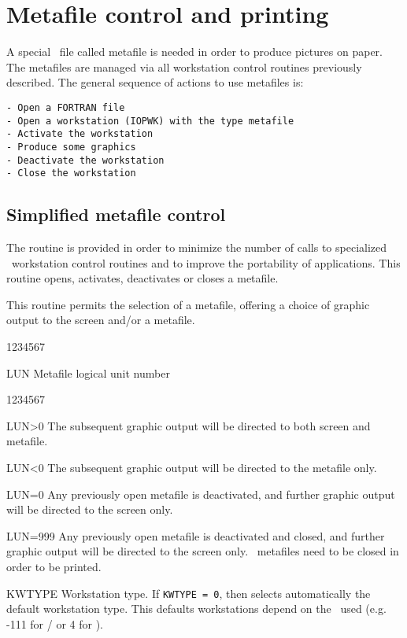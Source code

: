 %
%
\section{Metafile control and printing}
A special \ASCII~file called metafile is needed in order to produce pictures
on paper. The metafiles are managed via all workstation control routines
previously described. The general sequence of actions to use metafiles is:
\begin{verbatim}
- Open a FORTRAN file
- Open a workstation (IOPWK) with the type metafile
- Activate the workstation
- Produce some graphics
- Deactivate the workstation
- Close the workstation
\end{verbatim}
%
\subsection{Simplified metafile control}
The routine  is provided in order to minimize the number of
calls to specialized \HIGZ~workstation control routines and to improve
the portability of applications. This routine opens, activates, deactivates
or closes a metafile.

\Action
This routine permits the selection of a metafile, offering a choice of graphic
output to the screen and/or a metafile.
\Pdesc
\begin{DLtt}{1234567}
\item[LUN] Metafile logical unit number
\begin{DLtt}{1234567}
\item[LUN>0] The subsequent graphic output will be directed to both screen and
             metafile.
\item[LUN<0] The subsequent graphic output will be directed to the metafile
             only.
\item[LUN=0] Any previously open metafile is deactivated, and further graphic
             output will be directed to the screen only.
\item[LUN=999] Any previously open metafile is deactivated and closed, and
               further graphic output will be directed to the screen only.
               \PS~metafiles need to be closed in order to be printed.
\end{DLtt}
\item[KWTYPE] Workstation type. If {\tt KWTYPE = 0}, then  selects
              automatically the default workstation type. This defaults
              workstations depend on the \UGP~used (e.g. -111 for
	      \HIGZ/ or 4 for \GKSGRAL).
\end{DLtt}
%
